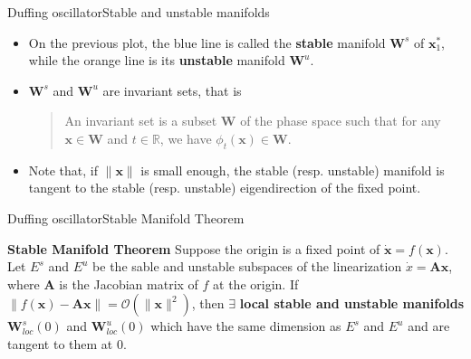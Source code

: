 \documentclass[usenames,dvipsnames,svgnames,10pt,aspectratio=169]{beamer}
\begin{document}
\begin{frame}[t, c]{Duffing oscillator}{Stable and unstable manifolds}
	\begin{itemize}
		\item On the previous plot, the blue line is called the \alert{\textbf{stable}} manifold ${\bm W}^s$ of ${\bm x}^*_1$, while the orange line is its \alert{\textbf{unstable}} manifold ${\bm W}^u$.

		\bigskip

		\item ${\bm W}^s$ and ${\bm W}^u$ are invariant sets, that is

		\bigskip

		\begin{quotation}
			An invariant set is a subset ${\bm W}$ of the phase space such that for any ${\bm x} \in {\bm W}$ and $t \in \mathbb{R}$, we have $\phi_t({\bm x}) \in {\bm W}$.
		\end{quotation}

		\bigskip

		\item Note that, if $\| {\bm x} \|$ is small enough, the stable (resp. unstable) manifold is tangent to the stable (resp. unstable) eigendirection of the fixed point.
	\end{itemize}

	\vspace{1cm}
\end{frame}

\begin{frame}[t, c]{Duffing oscillator}{Stable Manifold Theorem}
	\begin{block}{\textbf{Stable Manifold Theorem}}
		Suppose the origin is a fixed point of $\dot{\bm x} = f({\bm x})$. Let $E^s$ and $E^u$ be the sable and unstable subspaces of the linearization $\dot{x} = {\bm A}{\bm x}$, where ${\bm A}$ is the Jacobian matrix of $f$ at the origin. If $\| f({\bm x}) - {\bm A}{\bm x} \| = \mathcal{O}(\| {\bm x}\|^2)$, then $\exists$ \textbf{local stable and unstable manifolds} ${\bm W}_{loc}^s(0)$ and ${\bm W}_{loc}^u(0)$ which have the same dimension as $E^s$ and $E^u$ and are tangent to them at 0.
	\end{block}

	\vspace{1cm}
\end{frame}
\end{document}
